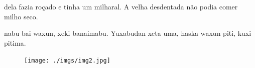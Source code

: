 \chapter*{}

\mbox{}\vspace*{\fill}




 dela fazia roçado e tinha
um milharal. A velha desdentada
não podia comer milho seco.

\vspace{2em}

 nabu bai waxun, xeki
banaimabu. Yuxabudan xeta uma,
haska waxun piti, kuxi pitima.

\vspace*{\fill}

\pagebreak
\thispagestyle{empty}
\begin{figure}
\vspace*{-1.6cm}
\hspace*{-2.2cm}\texttt{[image: ./imgs/img2.jpg]}
\end{figure}

\chapter*{}

\vspace*{-\baselineskip}


